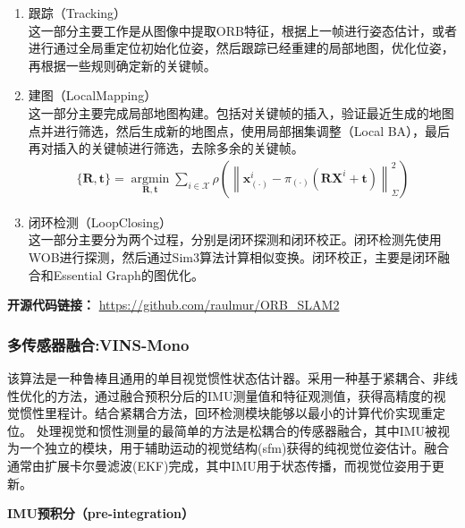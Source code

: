 \documentclass[cs4size,a4paper]{ctexart}
\numberwithin{equation}{section}
\numberwithin{table}{section}
\numberwithin{figure}{section}
\begin{document}
\begin{enumerate}
        \item 跟踪（Tracking）\\ 这一部分主要工作是从图像中提取ORB特征，根据上一帧进行姿态估计，或者进行通过全局重定位初始化位姿，然后跟踪已经重建的局部地图，优化位姿，再根据一些规则确定新的关键帧。
        \item 建图（LocalMapping）\\ 这一部分主要完成局部地图构建。包括对关键帧的插入，验证最近生成的地图点并进行筛选，然后生成新的地图点，使用局部捆集调整（Local BA），最后再对插入的关键帧进行筛选，去除多余的关键帧。
        \begin{align}
                \{\mathbf{R}, \mathbf{t}\}=\underset{\mathbf{R}, \mathbf{t}}{\operatorname{argmin}} \sum_{i \in \mathcal{X}} \rho\left(\left\|\mathbf{x}_{(\cdot)}^{i}-\pi_{(\cdot)}\left(\mathbf{R} \mathbf{X}^{i}+\mathbf{t}\right)\right\|_{\Sigma}^{2}\right)
        \end{align}
        \item 闭环检测（LoopClosing）\\ 这一部分主要分为两个过程，分别是闭环探测和闭环校正。闭环检测先使用WOB进行探测，然后通过Sim3算法计算相似变换。闭环校正，主要是闭环融合和Essential Graph的图优化。
\end{enumerate}

\textbf{开源代码链接：}
\url{https://github.com/raulmur/ORB_SLAM2}

\subsubsection{多传感器融合:VINS-Mono}
该算法\cite{8421746}是一种鲁棒且通用的单目视觉惯性状态估计器。采用一种基于紧耦合、非线性优化的方法，通过融合预积分后的IMU测量值和特征观测值，获得高精度的视觉惯性里程计。结合紧耦合方法，回环检测模块能够以最小的计算代价实现重定位。
处理视觉和惯性测量的最简单的方法是松耦合的传感器融合\cite{8576618,8630025}，其中IMU被视为一个独立的模块，用于辅助运动的视觉结构(sfm)获得的纯视觉位姿估计。融合通常由扩展卡尔曼滤波(EKF)完成，其中IMU用于状态传播，而视觉位姿用于更新。
  
\textbf{IMU预积分（pre-integration）}
\end{document}
